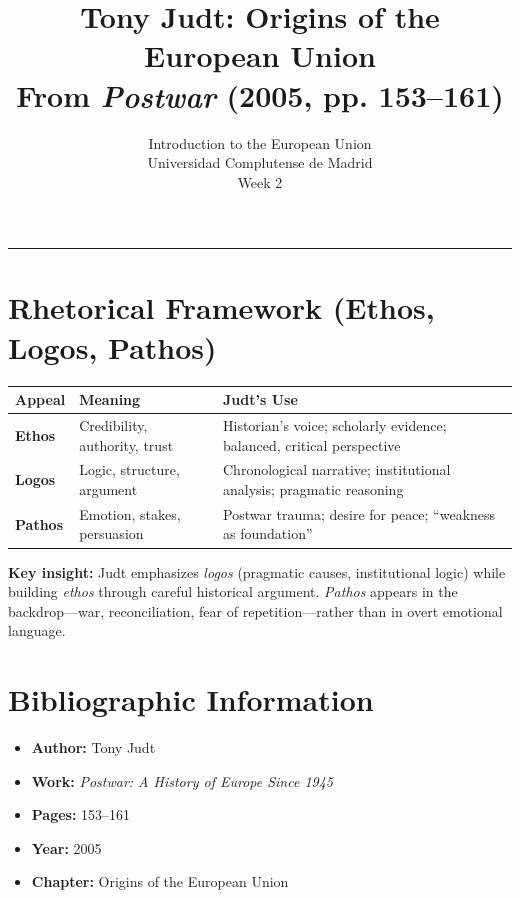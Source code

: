 \documentclass[11pt,a4paper]{article}
\begin{document}
\title{Tony Judt: Origins of the European Union\\From \textit{Postwar} (2005, pp. 153--161)}
\author{Introduction to the European Union\\Universidad Complutense de Madrid\\Week 2}
\date{}
\maketitle
\vspace{-1em}
\hrule
\vspace{1em}

\section*{Rhetorical Framework (Ethos, Logos, Pathos)}

\begin{table}[h]
\centering
\begin{tabular}{@{}lll@{}}
\toprule
\textbf{Appeal} & \textbf{Meaning} & \textbf{Judt's Use} \\
\midrule
\textbf{Ethos} & Credibility, authority, trust & Historian's voice; scholarly evidence; balanced, critical perspective \\
\textbf{Logos} & Logic, structure, argument & Chronological narrative; institutional analysis; pragmatic reasoning \\
\textbf{Pathos} & Emotion, stakes, persuasion & Postwar trauma; desire for peace; ``weakness as foundation'' \\
\bottomrule
\end{tabular}
\end{table}

\textbf{Key insight:} Judt emphasizes \textit{logos} (pragmatic causes, institutional logic) while building \textit{ethos} through careful historical argument. \textit{Pathos} appears in the backdrop---war, reconciliation, fear of repetition---rather than in overt emotional language.

\section*{Bibliographic Information}

\begin{itemize}
\item \textbf{Author:} Tony Judt
\item \textbf{Work:} \textit{Postwar: A History of Europe Since 1945}
\item \textbf{Pages:} 153--161
\item \textbf{Year:} 2005
\item \textbf{Chapter:} Origins of the European Union
\end{itemize}
\end{document}
